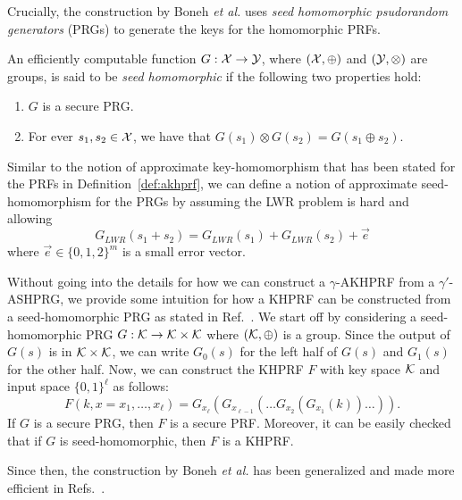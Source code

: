 Crucially, the construction by Boneh \emph{et al.} uses \emph{seed homomorphic psudorandom generators} (PRGs) to generate the keys for the homomorphic PRFs.

\begin{definition}
	An efficiently computable function $G: \mathcal{X} \to \mathcal{Y}$, where $(\mathcal{X}, \oplus)$ and $(\mathcal{Y}, \otimes)$ are groups, is said to be \emph{seed homomorphic} if the following two properties hold:
	\begin{enumerate}
		\item $G$ is a secure PRG.
		\item For ever $s_1, s_2 \in \mathcal{X}$, we have that $G\left(s_1\right) \otimes G\left(s_2\right) = G\left(s_1 \oplus s_2\right)$.
	\end{enumerate}
\end{definition}

Similar to the notion of approximate key-homomorphism that has been stated for the PRFs in Definition~\ref{def:akhprf}, we can define a notion of approximate seed-homomorphism for the PRGs by assuming the LWR problem is hard and allowing
\[G_{LWR}\left(s_1 + s_2\right) = G_{LWR}\left(s_1\right) + G_{LWR}\left(s_2\right) + \vec{e}\]
where $\vec{e} \in \{0, 1, 2\}^m$ is a small error vector.

Without going into the details for how we can construct a $\gamma$-AKHPRF from a $\gamma'$-ASHPRG, we provide some intuition for how a KHPRF can be constructed from a seed-homomorphic PRG as stated in Ref.~\cite{boneh2013key}.
We start off by considering a seed-homomorphic PRG $G: \mathcal{K} \to \mathcal{K} \times \mathcal{K}$ where $(\mathcal{K}, \oplus)$ is a group.
Since the output of $G(s)$ is in $\mathcal{K} \times \mathcal{K}$, we can write $G_0(s)$ for the left half of $G(s)$ and $G_1(s)$ for the other half. 
Now, we can construct the KHPRF $F$ with key space $\mathcal{K}$ and input space $\{0, 1\}^\ell$ as follows:
\[F(k, x=x_1, \ldots, x_\ell) = G_{x_\ell}\left(G_{x_{\ell - 1}}\left(\ldots G_{x_2}\left(G_{x_1}(k)\right)\ldots \right)\right).\]
If $G$ is a secure PRG, then $F$ is a secure PRF.
Moreover, it can be easily checked that if $G$ is seed-homomorphic, then $F$ is a KHPRF.

Since then, the construction by Boneh \emph{et al.} has been generalized and made more efficient in Refs.~\cite{newKeyHom, kim2020key}.

